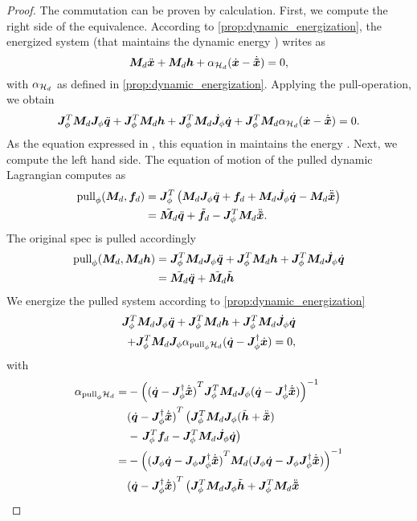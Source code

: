 \begin{proof}
  The commutation can be proven by calculation. First, we compute the right side of the
equivalence. According to \cref{prop:dynamic_energization}, the energized system (that
maintains the dynamic energy \hd{}) writes as 
\[
  \bm{M}_d\ddot{\bm{x}} + \bm{M}_d\bm{h} + \alpha_{\mathcal{H}_d}(\dot{\bm{x}}-\dot{\bm{\tilde{x}}}) = 0, 
\]
with $\alpha_{\mathcal{H}_d}$ as defined in \cref{prop:dynamic_energization}.
Applying the pull-operation, we obtain
\begin{equation}
  \bm{J}^T_{\phi}\bm{M}_d\bm{J}_{\phi}\ddot{\bm{q}} + \bm{J}^T_{\phi}\bm{M}_d\bm{h} + \bm{J}^T_{\phi}\bm{M}_d\dot{\bm{J}}_{\phi}\dot{\bm{q}} + \bm{J}^T_{\phi}\bm{M}_d\alpha_{\mathcal{H}_d}(\dot{\bm{x}}-\dot{\bm{\tilde{x}}}) = 0.
  \label{eq:pulled_energized_system}
\end{equation}
As the equation expressed in \X{}, this equation in \Q{} maintains the energy \hd{}. Next,
we compute the left hand side. The equation of motion of the pulled dynamic Lagrangian \ld{}
computes as 
\begin{align*}
  \textrm{pull}_{\phi}{(\bm{M}_d,\bm{f}_d)}
    &= \bm{J}^T_{\phi}\left(\bm{M}_d\bm{J}_{\phi}\ddot{\bm{q}}  + \bm{f}_d + \bm{M}_d\dot{\bm{J}}_{\phi}\dot{\bm{q}} - \bm{M}_d\ddot{\bm{\tilde{x}}}\right)\\
    &= \tilde{\bm{M}_d}\ddot{\bm{q}}  + \tilde{\bm{f}_d} - \bm{J}^T_{\phi}\bm{M}_d\ddot{\bm{\tilde{x}}}.
\end{align*}
The original spec is pulled accordingly
\begin{align*}
  \textrm{pull}_{\phi}{(\bm{M}_d,\bm{M}_d\bm{h})} &=
  \bm{J}^T_{\phi}\bm{M}_d\bm{J}_{\phi}\ddot{\bm{q}} + \bm{J}^T_{\phi}\bm{M}_d\bm{h} + \bm{J}^T_{\phi}\bm{M}_d\dot{\bm{J}}_{\phi}\dot{\bm{q}} \\
  &= \tilde{\bm{M}_d}\ddot{\bm{q}} + \tilde{\bm{M}_d}\tilde{\bm{h}}
\end{align*}
We energize the pulled system according to \cref{prop:dynamic_energization}
\begin{equation}
  \begin{split}
    \bm{J}^T_{\phi}\bm{M}_d\bm{J}_{\phi}\ddot{\bm{q}} + \bm{J}^T_{\phi}\bm{M}_d\bm{h} + \bm{J}^T_{\phi}\bm{M}_d\dot{\bm{J}}_{\phi}\dot{\bm{q}} \\
    + \bm{J}^T_{\phi}\bm{M}_d\bm{J}_{\phi}\alpha_{\textrm{pull}_{\phi}{\mathcal{H}_d}}(\dot{\bm{q}}-\bm{J}_{\phi}^{\dagger}\dot{\bm{x}}) = 0, 
  \end{split}
\label{eq:energized_pulled_system}
\end{equation}
with 
\begin{align*}
  \alpha_{\pull{\map}{\hd}} = 
    & -{\left({(\qdot-\pinv{\J}\xtdot)}^T\Jt\Md\J(\qdot-\pinv{\J}\xtdot)\right)}^{-1} \\
    & {(\qdot-\pinv{\J}\xtdot)}^T\left(\Jt\Md\J(\tilde{\h}+\xtddot)\right. \\
    & - \left.\Jt\fd - \Jt\Md\Jdot\qdot\right) \\
    = & -{\left({(\J\qdot-\J\pinv{\J}\xtdot)}^T\Md(\J\qdot-\J\pinv{\J}\xtdot)\right)}^{-1} \\
    & {(\qdot-\pinv{\J}\xtdot)}^T\left(\Jt\Md\J\tilde{\h}+\Jt\Md\xtddot\right. \\

\end{align*}
\end{proof}
